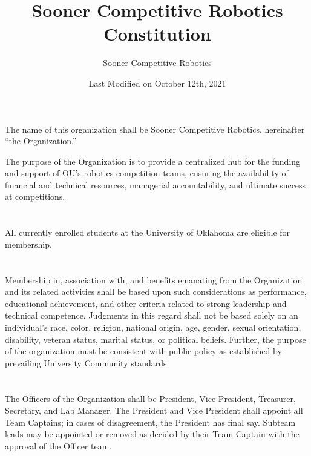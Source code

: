 \documentclass[12pt]{cls/constitution}
\begin{document}
\title{Sooner Competitive Robotics Constitution}
\author{Sooner Competitive Robotics}
\date{Last Modified on October 12th, 2021}
\maketitle
\setcounter{tocdepth}{0}
\tableofcontents
\newpage


The name of this organization shall be Sooner Competitive Robotics, hereinafter “the Organization.”


The purpose of the Organization is to provide a centralized hub for the funding and support of OU's robotics competition teams, ensuring the availability of financial and technical resources, managerial accountability, and ultimate success at competitions. 


\section{}
All currently enrolled students at the University of Oklahoma are eligible for membership. 

\section{}
Membership in, association with, and benefits emanating from the Organization and its related activities shall be based upon such considerations as performance, educational achievement, and other criteria related to strong leadership and technical competence. Judgments in this regard shall not be based solely on an individual’s race, color, religion, national origin, age, gender, sexual orientation, disability, veteran status, marital status, or political beliefs. Further, the purpose of the organization must be consistent with public policy as established by prevailing University Community standards.  


\section{}
The Officers of the Organization shall be President, Vice President, Treasurer, Secretary, and Lab Manager.
The President and Vice President shall appoint all Team Captains; in cases of disagreement, the President has final say.
Subteam leads may be appointed or removed as decided by their Team Captain with the approval of the Officer team.
\end{document}
